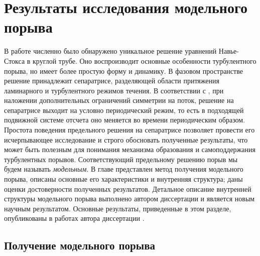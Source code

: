 
\chapter{Результаты исследования модельного порыва}


В работе \cite{Avila2013} численно было обнаружено уникальное решение уравнений Навье-Стокса в круглой трубе. Оно воспроизводит основные особенности турбулентного порыва, но имеет более простую форму и динамику. В фазовом пространстве решение принадлежит сепаратрисе, разделяющей области притяжения ламинарного и турбулентного режимов течения. В соответствии с \cite{Avila2013}, при наложении дополнительных ограничений симметрии на поток, решение на сепаратрисе выходит на условно периодический режим, то есть в подходящей подвижной системе отсчета оно меняется во времени периодическим образом. Простота поведения предельного решения на сепаратрисе позволяет провести его исчерпывающее исследование и строго обосновать полученные результаты, что может быть полезным для понимания механизма образования и самоподдержания турбулентных порывов. Соответствующий предельному решению порыв мы будем называть {\it модельным}. В главе представлен метод получения модельного порыва, описаны основные его характеристики и внутренняя структура; даны оценки достоверности полученных результатов. Детальное описание внутренней структуры модельного порыва выполнено автором диссертации и является новым научным результатом. Основные результаты, приведенные в этом разделе, опубликованы в работах автора диссертации \cite{MZG2015, Kazan2015, KMU2015}. 


\section{Получение модельного порыва} \label{edge_seq}

